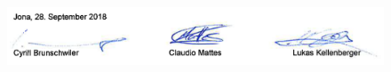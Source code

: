 \begin{figure}[H]
    \centering
    \includegraphics[width=1\linewidth]{assets/task-definition/task_signs.png}
\end{figure}
\thispagestyle{plain}

\renewcommand\section{\clearpage\stdsection}



